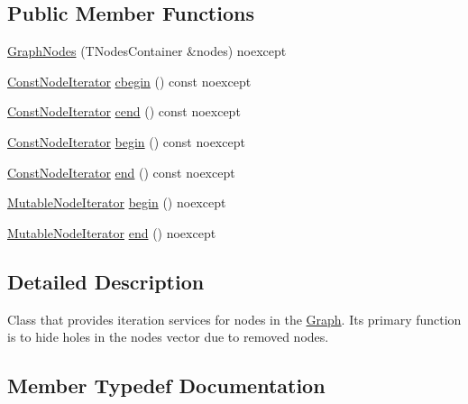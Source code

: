\subsection*{Public Member Functions}
\begin{DoxyCompactItemize}
\item 
\mbox{\hyperlink{classonnxruntime_1_1GraphNodes_a7222da2e71a88c370ecd61bbdfb6fa0b}{Graph\+Nodes}} (T\+Nodes\+Container \&nodes) noexcept
\item 
\mbox{\hyperlink{classonnxruntime_1_1GraphNodes_a291880456b7298e7daededf91e494b6a}{Const\+Node\+Iterator}} \mbox{\hyperlink{classonnxruntime_1_1GraphNodes_aa80817528df1c60051efab8da5d0f3af}{cbegin}} () const noexcept
\item 
\mbox{\hyperlink{classonnxruntime_1_1GraphNodes_a291880456b7298e7daededf91e494b6a}{Const\+Node\+Iterator}} \mbox{\hyperlink{classonnxruntime_1_1GraphNodes_a35efe6c770f4ecbe12d5d49aa239105e}{cend}} () const noexcept
\item 
\mbox{\hyperlink{classonnxruntime_1_1GraphNodes_a291880456b7298e7daededf91e494b6a}{Const\+Node\+Iterator}} \mbox{\hyperlink{classonnxruntime_1_1GraphNodes_adc1b59aa4d9e881aedb831f894d18a32}{begin}} () const noexcept
\item 
\mbox{\hyperlink{classonnxruntime_1_1GraphNodes_a291880456b7298e7daededf91e494b6a}{Const\+Node\+Iterator}} \mbox{\hyperlink{classonnxruntime_1_1GraphNodes_aa9426cdcde9482961f8bae49278990ad}{end}} () const noexcept
\item 
\mbox{\hyperlink{classonnxruntime_1_1GraphNodes_ab5a670376171a0bc405018f0d6bb909d}{Mutable\+Node\+Iterator}} \mbox{\hyperlink{classonnxruntime_1_1GraphNodes_aa4be9eb877bdf0e6ffa7d4bdf1b59a2d}{begin}} () noexcept
\item 
\mbox{\hyperlink{classonnxruntime_1_1GraphNodes_ab5a670376171a0bc405018f0d6bb909d}{Mutable\+Node\+Iterator}} \mbox{\hyperlink{classonnxruntime_1_1GraphNodes_a6f722ad93ac2141a7ea3d004f2e80da6}{end}} () noexcept
\end{DoxyCompactItemize}


\subsection{Detailed Description}
Class that provides iteration services for nodes in the \mbox{\hyperlink{classonnxruntime_1_1Graph}{Graph}}. It\textquotesingle{}s primary function is to hide holes in the nodes vector due to removed nodes. 

\subsection{Member Typedef Documentation}
\mbox{\label{classonnxruntime_1_1GraphNodes_a291880456b7298e7daededf91e494b6a}} 
